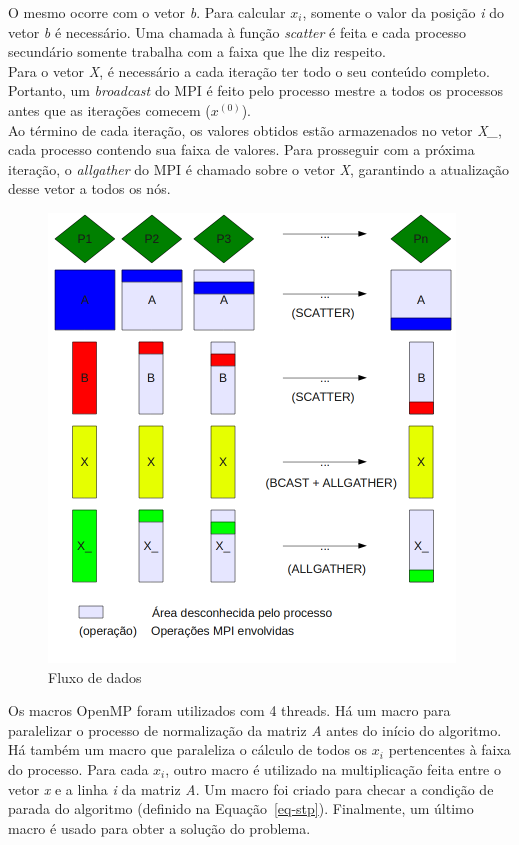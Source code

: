 \documentclass[a4paper]{article}
\begin{document}
\indent O mesmo ocorre com o vetor \emph{b}. Para calcular \begin{math}x_i\end{math}, somente o valor da posição \emph{i} do vetor \emph{b} é necessário. Uma chamada à função \emph{scatter} é feita e cada processo secundário somente trabalha com a faixa que lhe diz respeito.\\
\indent Para o vetor \emph{X}, é necessário a cada iteração ter todo o seu conteúdo completo. Portanto, um \emph{broadcast} do MPI é feito pelo processo mestre a todos os processos antes que as iterações comecem (\begin{math}x^{(0)}\end{math}).\\
\indent Ao término de cada iteração, os valores obtidos estão armazenados no vetor \emph{X\_}, cada processo contendo sua faixa de valores. Para prosseguir com a próxima iteração, o \emph{allgather} do MPI é chamado sobre o vetor \emph{X}, garantindo a atualização desse vetor a todos os nós.\\
\begin{figure}[float=p]
	\centerline{\includegraphics[width=408px, height=450px]{data}}
	\caption{Fluxo de dados}
	\label{pic-data}
\end{figure}
\indent Os macros OpenMP foram utilizados com 4 threads. Há um macro para paralelizar o processo de normalização da matriz \emph{A} antes do início do algoritmo. Há também um macro que paraleliza o cálculo de todos os \begin{math}x_i\end{math} pertencentes à faixa do processo. Para cada \begin{math}x_i\end{math}, outro macro é utilizado na multiplicação feita entre o vetor \emph{x} e a linha \emph{i} da matriz \emph{A}. Um macro foi criado para checar a condição de parada do algoritmo (definido na Equação~\ref{eq-stp}). Finalmente, um último macro é usado para obter a solução do problema.
\end{document}
